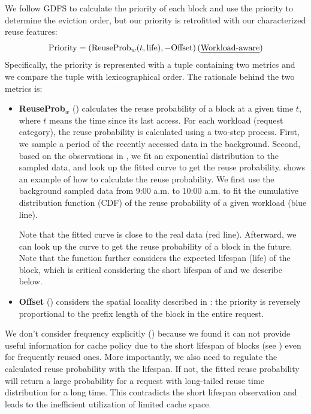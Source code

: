 We follow GDFS to calculate the priority of each {\kvcache} block and use
the priority to determine the eviction order,
but our priority is retrofitted with our characterized {\kvcache} reuse features:
$$
\text{Priority} = ({\text{ReuseProb}_w(t, \text{life})},{-\text{Offset}}) \,(\text{\uline{Workload-aware}})
$$
\noindent
Specifically, the priority is represented with a tuple containing two metrics
and we compare the tuple with lexicographical order.
The rationale behind the two metrics is: \\[-10pt]
\begin{itemize}[leftmargin=*,leftmargin=10pt,itemindent=0pt]
    \item \textbf{ReuseProb$_w$} () calculates the reuse probability of a {\kvcache} block
    at a given time $t$, where $t$ means the time since its last access.
    For each workload (request category),
    the reuse probability is calculated using a two-step process.
    First, we sample a period of the recently accessed data in the background.
    Second, based on the observations in {},
    we fit an exponential distribution to the sampled data,
    and look up the fitted curve to get the reuse probability.
    {} shows an example of how to calculate the reuse probability.
    We first use the background sampled data from 9:00 a.m. to 10:00 a.m. to fit the cumulative distribution function (CDF) of the
    reuse probability of a given workload (blue line).

    Note that the fitted curve is close to the real data (red line).
    Afterward, we can look up the curve to get the reuse probability of a {\kvcache} block in the future.
    Note that the function further considers the expected lifespan (life) of the block,
    which is critical considering the short lifespan of {\kvcache} and we describe below.  \\[-10pt]

    \item \textbf{Offset} () considers the spatial locality described in 
    \textsection{\ref{sec:motiv-temporal-spatial}}:
    the priority is reversely proportional to the prefix length of the {\kvcache} block in the entire request. \\[-10pt]
\end{itemize}

We don't consider frequency explicitly  ()
because we found it can not provide useful information for cache policy
due to the short lifespan of {\kvcache} blocks (see {}) even for frequently reused ones.
More importantly, we also need to regulate the calculated reuse probability
with the lifespan.
If not, the fitted reuse probability will return a large probability for a request
with long-tailed reuse time distribution for a long time.
This contradicts the short {\kvcache} lifespan observation
and leads to the inefficient utilization of limited cache space.


